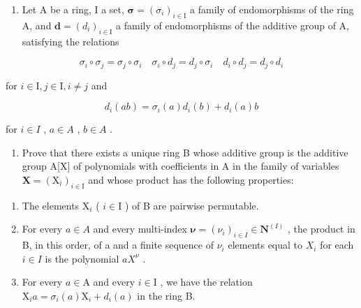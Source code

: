 \begin{enumerate}
\def\labelenumi{\arabic{enumi})}
\setcounter{enumi}{22}
\tightlist
\item
  Let A be a ring, I a set, \(\symbf{\sigma} = (\sigma_{i})_{i \in \mathrm{I}}\) a family of endomorphisms of the ring A, and \(\symbf{d} = (d_{i})_{i \in \mathrm{I}}\) a family of endomorphisms of the additive group of A, satisfying the relations
\end{enumerate}

\[
\sigma_ {i} \circ \sigma_ {j} = \sigma_ {j} \circ \sigma_ {i} \quad \sigma_ {i} \circ d _ {j} = d _ {j} \circ \sigma_ {i} \quad d _ {i} \circ d _ {j} = d _ {j} \circ d _ {i}
\]

for \(i\in \mathrm{I},j\in \mathrm{I},i\neq j\) and

\[
d _ {i} (a b) = \sigma_ {i} (a) d _ {i} (b) + d _ {i} (a) b
\]

for \(i \in I\) , \(a \in A\) , \(b \in A\) .

\begin{enumerate}
\def\labelenumi{\alph{enumi})}
\tightlist
\item
  Prove that there exists a unique ring B whose additive group is the additive group A{[}X{]} of polynomials with coefficients in A in the family of variables \(\mathbf{X} = (\mathrm{X}_{i})_{i \in \mathrm{I}}\) and whose product has the following properties:
\end{enumerate}

\begin{enumerate}
\def\labelenumi{(\roman{enumi})}
\item
  The elements \(\mathrm{X}_i\) ( \(i \in \mathrm{I}\) ) of B are pairwise permutable.
\item
  For every \(a \in A\) and every multi-index \(\boldsymbol{\nu} = (\nu_i)_{i \in I} \in \mathbf{N}^{(I)}\) , the product in B, in this order, of a and a finite sequence of \(\nu_i\) elements equal to \(X_i\) for each \(i \in I\) is the polynomial \(aX^\nu\) .
\item
  For every \(a \in \mathrm{A}\) and every \(i \in \mathrm{I}\) , we have the relation \(\mathrm{X}_i a = \sigma_i(a)\mathrm{X}_i + d_i(a)\) in the ring B.
\end{enumerate}

